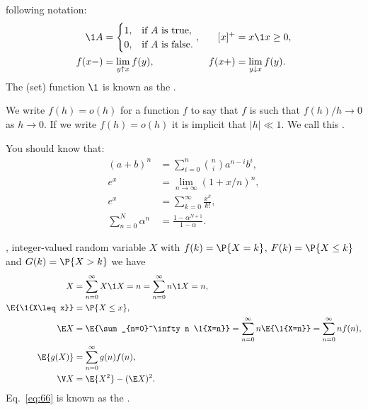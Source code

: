 \documentclass[queueing_book]{subfiles}
\begin{document}
 following notation:
 \begin{align*}
 \1{A} &=
 \begin{cases}
 1, & \text{if $A$ is true}, \\
 0, & \text{if $A$ is false}.
 \end{cases},
& [x]^+ &= x \1{x\geq 0}, \\
 f(x-) &= \lim_{y\uparrow x} f(y), &
 f(x+) &= \lim_{y\downarrow x} f(y).
\end{align*}
The (set) function $\1{}$ is known as the .

We write $f(h)=o(h)$ for a function $f$ to say that $f$ is such that $f(h)/h \to 0$ as $h\to 0$.
If we write $f(h) = o(h)$ it is implicit that $|h| \ll 1$.
We call this .


You should know that:
\begin{subequations}
 \begin{align}
 (a+b)^n &= \sum_{i=0}^n {n \choose i} a^{n-i} b^i, \label{eq:71}\\
e^x &= \lim_{n\to\infty} (1+x/n)^n, \label{eq:65}\\
 e^x &= \sum_{k=0}^{\infty} \frac{x^k}{k!}, \label{eq:76}\\
 \sum_{n=0}^N \alpha^n &= \frac{1-\alpha^{N+1}}{1-\alpha}. \label{eq:61}
\end{align}
\end{subequations}

, integer-valued random variable $X$ with  $f(k)= \P{X = k}$,
 $F(k)=\P{X\leq k}$ and  $G(k) = \P{X>k}$ we have
\begin{subequations}\label{eq:105}
\begin{align}
X&=\sum_{n=0}^\infty X\1{X=n} = \sum_{n=0}^\infty n \1{X=n}, \label{eq:77} \\
\E{\1{X\leq x}} &= \P{X\leq x}, \label{eq:74}\\
\E X &= \E{\sum_{n=0}^\infty n \1{X=n}} = \sum_{n=0}^\infty n \E{\1{X=n}} = \sum_{n=0}^\infty n f(n), \label{eq:p-78} \\
  \E{g(X)} &= \sum_{n=0}^\infty g(n) f(n), \label{eq:66} \\
  \V X &= \E{X^2} - (\E X)^2.\label{eq:68}\\
\end{align}
\end{subequations}
Eq.~\cref{eq:66} is known as the .
\end{document}
